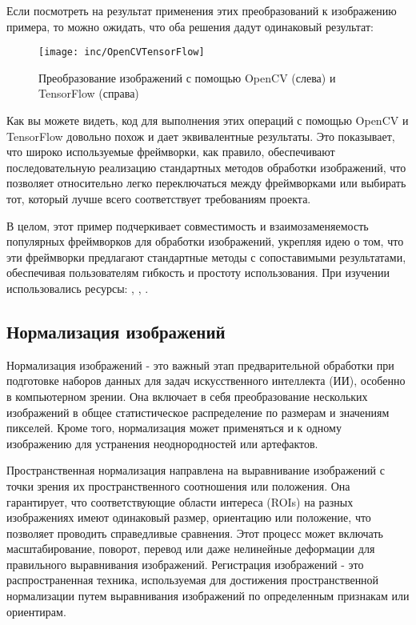 Если посмотреть на результат применения этих преобразований к изображению примера, то можно ожидать, что оба решения дадут одинаковый результат:

\begin{figure}
  \texttt{[image: inc/OpenCVTensorFlow]}
  \caption{Преобразование изображений с помощью OpenCV (слева) и TensorFlow (справа)}
  \label{fig:fig03}
\end{figure}

Как вы можете видеть, код для выполнения этих операций с помощью OpenCV и TensorFlow довольно похож и дает эквивалентные результаты. Это показывает, что широко используемые фреймворки, как правило, обеспечивают последовательную реализацию стандартных методов обработки изображений, что позволяет относительно легко переключаться между фреймворками или выбирать тот, который лучше всего соответствует требованиям проекта.

В целом, этот пример подчеркивает совместимость и взаимозаменяемость популярных фреймворков для обработки изображений, укрепляя идею о том, что эти фреймворки предлагают стандартные методы с сопоставимыми результатами, обеспечивая пользователям гибкость и простоту использования.
При изучении использовались ресурсы: \cite{33}, \cite{35}, \cite{34}.

\subsection{Нормализация изображений}

Нормализация изображений - это важный этап предварительной обработки при подготовке наборов данных для задач искусственного интеллекта (ИИ), особенно в компьютерном зрении. Она включает в себя преобразование нескольких изображений в общее статистическое распределение по размерам и значениям пикселей. Кроме того, нормализация может применяться и к одному изображению для устранения неоднородностей или артефактов.

Пространственная нормализация направлена на выравнивание изображений с точки зрения их пространственного соотношения или положения. Она гарантирует, что соответствующие области интереса (ROIs) на разных изображениях имеют одинаковый размер, ориентацию или положение, что позволяет проводить справедливые сравнения. Этот процесс может включать масштабирование, поворот, перевод или даже нелинейные деформации для правильного выравнивания изображений. Регистрация изображений - это распространенная техника, используемая для достижения пространственной нормализации путем выравнивания изображений по определенным признакам или ориентирам.

